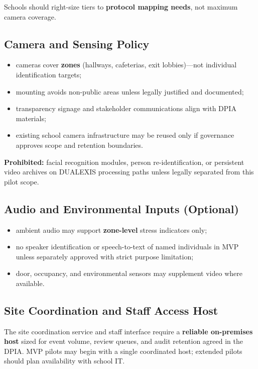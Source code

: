 Schools should right-size tiers to \textbf{protocol mapping needs}, not maximum camera coverage.

\subsection{Camera and Sensing Policy}

\begin{itemize}[noitemsep]
  \item cameras cover \textbf{zones} (hallways, cafeterias, exit lobbies)---not individual
        identification targets;
  \item mounting avoids non-public areas unless legally justified and documented;
  \item transparency signage and stakeholder communications align with DPIA materials;
  \item existing school camera infrastructure may be reused only if governance approves
        scope and retention boundaries.
\end{itemize}

\textbf{Prohibited:} facial recognition modules, person re-identification, or persistent
video archives on DUALEXIS processing paths unless legally separated from this pilot scope.

\subsection{Audio and Environmental Inputs (Optional)}

\begin{itemize}[noitemsep]
  \item ambient audio may support \textbf{zone-level} stress indicators only;
  \item no speaker identification or speech-to-text of named individuals in MVP unless
        separately approved with strict purpose limitation;
  \item door, occupancy, and environmental sensors may supplement video where available.
\end{itemize}

\subsection{Site Coordination and Staff Access Host}

The site coordination service and staff interface require a \textbf{reliable on-premises
host} sized for event volume, review queues, and audit retention agreed in the DPIA.
MVP pilots may begin with a single coordinated host; extended pilots should plan
availability with school IT.

